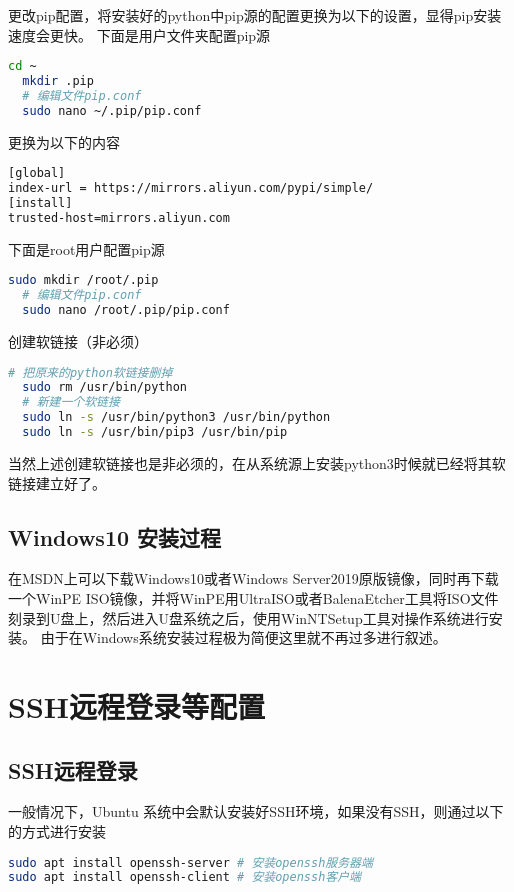\documentclass[lang=cn,a4paper,newtx]{elegantpaper}
\begin{document}
更改pip配置，将安装好的python中pip源的配置更换为以下的设置，显得pip安装速度会更快。
下面是用户文件夹配置pip源
\begin{lstlisting}[language=bash]
  cd ~
  mkdir .pip
  # 编辑文件pip.conf
  sudo nano ~/.pip/pip.conf  
\end{lstlisting}

更换为以下的内容
\begin{lstlisting}[language=bash]
[global]
index-url = https://mirrors.aliyun.com/pypi/simple/
[install]
trusted-host=mirrors.aliyun.com
\end{lstlisting}

下面是root用户配置pip源
\begin{lstlisting}[language=bash]
  sudo mkdir /root/.pip
  # 编辑文件pip.conf
  sudo nano /root/.pip/pip.conf
\end{lstlisting}

创建软链接（非必须）

\begin{lstlisting}[language=bash]
  # 把原来的python软链接删掉
  sudo rm /usr/bin/python
  # 新建一个软链接
  sudo ln -s /usr/bin/python3 /usr/bin/python
  sudo ln -s /usr/bin/pip3 /usr/bin/pip
\end{lstlisting}

当然上述创建软链接也是非必须的，在从系统源上安装python3时候就已经将其软链接建立好了。


\subsection{Windows10 安装过程}
在MSDN上可以下载Windows10或者Windows Server2019原版镜像，同时再下载一个WinPE ISO镜像，并将WinPE用UltraISO或者BalenaEtcher工具将ISO文件刻录到U盘上，然后进入U盘系统之后，使用WinNTSetup工具对操作系统进行安装。
由于在Windows系统安装过程极为简便这里就不再过多进行叙述。


\section{SSH远程登录等配置}
\subsection{SSH远程登录}
一般情况下，Ubuntu 系统中会默认安装好SSH环境，如果没有SSH，则通过以下的方式进行安装
\begin{lstlisting}[language=bash]
sudo apt install openssh-server # 安装openssh服务器端
sudo apt install openssh-client # 安装openssh客户端
\end{lstlisting}
\end{document}
